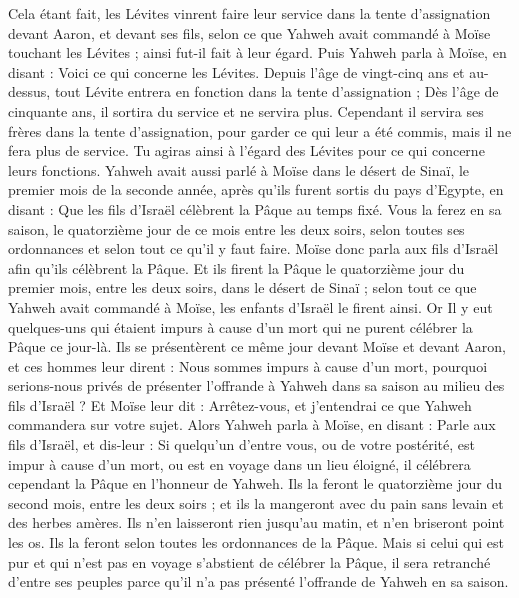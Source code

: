 \begin{multicols}{2}
Cela étant fait, les Lévites vinrent faire leur service dans la tente d'assignation devant Aaron, et devant ses fils, selon ce que Yahweh avait commandé à Moïse touchant les Lévites ; ainsi fut-il fait à leur égard.
Puis Yahweh parla à Moïse, en disant :
Voici ce qui concerne les Lévites. Depuis l'âge de vingt-cinq ans et au-dessus, tout Lévite entrera en fonction dans la tente d'assignation ;
Dès l'âge de cinquante ans, il sortira du service et ne servira plus.
Cependant il servira ses frères dans la tente d'assignation, pour garder ce qui leur a été commis, mais il ne fera plus de service. Tu agiras ainsi à l'égard des Lévites pour ce qui concerne leurs fonctions.
\VerseOne{}Yahweh avait aussi parlé à Moïse dans le désert de Sinaï, le premier mois de la seconde année, après qu'ils furent sortis du pays d'Egypte, en disant :
Que les fils d'Israël célèbrent la Pâque au temps fixé.
Vous la ferez en sa saison, le quatorzième jour de ce mois entre les deux soirs, selon toutes ses ordonnances et selon tout ce qu'il y faut faire.
Moïse donc parla aux fils d'Israël afin qu'ils célèbrent la Pâque.
Et ils firent la Pâque le quatorzième jour du premier mois, entre les deux soirs, dans le désert de Sinaï ; selon tout ce que Yahweh avait commandé à Moïse, les enfants d'Israël le firent ainsi.
Or Il y eut quelques-uns qui étaient impurs à cause d'un mort qui ne purent célébrer la Pâque ce jour-là. Ils se présentèrent ce même jour devant Moïse et devant Aaron,
et ces hommes leur dirent : Nous sommes impurs à cause d'un mort, pourquoi serions-nous privés de présenter l'offrande à Yahweh dans sa saison au milieu des fils d'Israël ?
Et Moïse leur dit : Arrêtez-vous, et j'entendrai ce que Yahweh commandera sur votre sujet.
Alors Yahweh parla à Moïse, en disant :
Parle aux fils d'Israël, et dis-leur : Si quelqu'un d'entre vous, ou de votre postérité, est impur à cause d'un mort, ou est en voyage dans un lieu éloigné, il célébrera cependant la Pâque en l'honneur de Yahweh.
Ils la feront le quatorzième jour du second mois, entre les deux soirs ; et ils la mangeront avec du pain sans levain et des herbes amères.
Ils n'en laisseront rien jusqu'au matin, et n'en briseront point les os. Ils la feront selon toutes les ordonnances de la Pâque.
Mais si celui qui est pur et qui n'est pas en voyage s'abstient de célébrer la Pâque, il sera retranché d'entre ses peuples parce qu'il n'a pas présenté l'offrande de Yahweh en sa saison.

\end{multicols}
